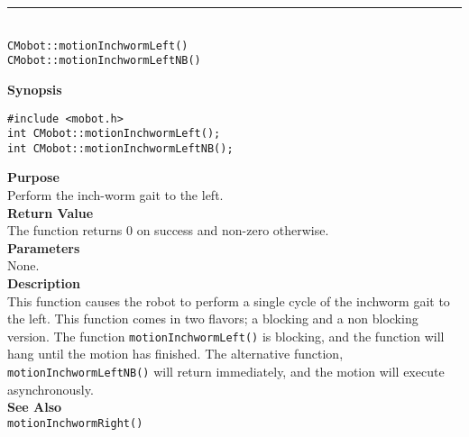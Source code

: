 \noindent
\vspace{5pt}
\rule{4.5in}{0.015in}\\
\noindent
{\LARGE \texttt{CMobot::motionInchwormLeft()}}\\
{\LARGE \texttt{CMobot::motionInchwormLeftNB()}}\\
{}

\noindent
{\bf Synopsis}
\begin{verbatim}
#include <mobot.h>
int CMobot::motionInchwormLeft();
int CMobot::motionInchwormLeftNB();
\end{verbatim}

\noindent
{\bf Purpose}\\
Perform the inch-worm gait to the left.\\

\noindent
{\bf Return Value}\\
The function returns 0 on success and non-zero otherwise.\\

\noindent
{\bf Parameters}\\
None.\\

\noindent
{\bf Description}\\
This function causes the robot to perform a single cycle of the inchworm gait
to the left. This function comes in two flavors; a blocking and a non blocking
version. The function \texttt{motionInchwormLeft()} is blocking, and the function
will hang until the motion has finished. The alternative function, \texttt{motionInchwormLeftNB()} 
will return immediately, and the motion will execute asynchronously. \\

\noindent
{\bf See Also}\\
\texttt{motionInchwormRight()}

